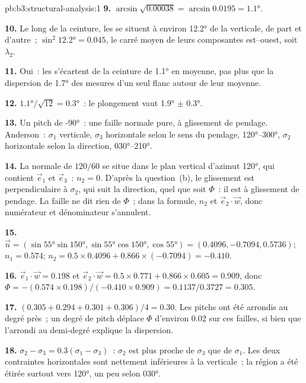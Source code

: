\begin{solution}{pb:b3:structural-analysis:1}
\textbf{9.} $\arcsin\sqrt{0.00038} = \arcsin0.0195 = \ang{1.1}$.

\textbf{10.} Le long de la ceinture, les  se situent à environ \ang{12.2} de la verticale,
de part et d'autre~; $\sin^2\ang{12.2} = 0.045$, le carré moyen de leurs
composantes est--ouest, soit $\lambda_2$.

\textbf{11.} Oui~: les  s'écartent de la ceinture de \ang{1.1} en moyenne, pas plus
que la dispersion de \ang{1.7} des mesures d'un seul flanc autour de leur moyenne.

\textbf{12.} $\ang{1.1}/\sqrt{12} = \ang{0.3}$~: le plongement vaut \ang{1.9} $\pm$
\ang{0.3}.

\textbf{13.} Un pitch de \ang{-90}~: une faille normale pure, à glissement de pendage. Anderson~:
$\sigma_1$ verticale, $\sigma_3$ horizontale selon le sens du pendage,
\ang{120}--\ang{300}, $\sigma_2$ horizontale selon la direction,
\ang{030}--\ang{210}.

\textbf{14.} La normale de $120/60$ se situe dans le plan vertical d'azimut
\ang{120}, qui contient $\vec e_1$ et $\vec e_3$~: $n_2 = 0$. D'après la question~(b), le
glissement est perpendiculaire à $\sigma_2$, qui suit la direction, quel que soit $\Phi$~: il est
à glissement de pendage. La faille ne dit rien de $\Phi$~; dans la formule, $n_2$ et
$\vec e_2\cdot\vec w$, donc numérateur et dénominateur s'annulent.

\textbf{15.} $\vec n = (\sin\ang{55}\sin\ang{150}, \sin\ang{55}\cos\ang{150},
\cos\ang{55}) = (0.4096, -0.7094, 0.5736)$; $n_1 = 0.574$; $n_2 = 0.5\times
0.4096 + 0.866\times(-0.7094) = -0.410$.

\textbf{16.} $\vec e_1\cdot\vec w = 0.198$ et $\vec e_2\cdot\vec w = 0.5\times
0.771 + 0.866\times0.605 = 0.909$, donc $\Phi = -(0.574\times0.198)/(-0.410\times
0.909) = 0.1137/0.3727 = 0.305$.

\textbf{17.} $(0.305 + 0.294 + 0.301 + 0.306)/4 = 0.30$. Les pitchs ont été
arrondis au degré près~; un degré de pitch déplace $\Phi$ d'environ 0.02 sur ces
failles, si bien que l'arrondi au demi-degré explique la dispersion.

\textbf{18.} $\sigma_2 - \sigma_3 = 0.3(\sigma_1 - \sigma_3)$~: $\sigma_2$ est
plus proche de $\sigma_3$ que de $\sigma_1$. Les deux contraintes horizontales sont nettement
inférieures à la verticale~; la région a été étirée surtout vers \ang{120}, un
peu selon \ang{030}.


\end{solution}
